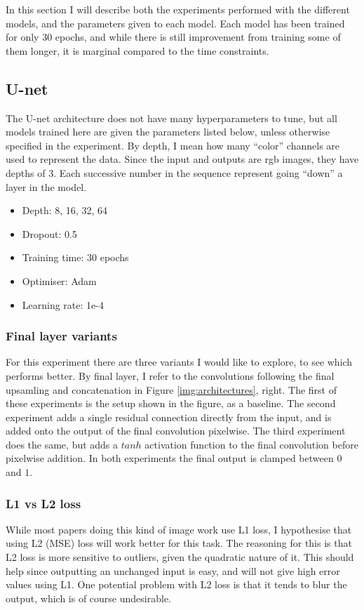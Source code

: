 In this section I will describe both the experiments performed with the different models, and the parameters given to each model. Each model has been trained for only 30 epochs, and while there is still improvement from training some of them longer, it is marginal compared to the time constraints.
\subsection{U-net}
The U-net architecture does not have many hyperparameters to tune, but all models trained here are given the parameters listed below, unless otherwise specified in the experiment. By depth, I mean how many ``color'' channels are used to represent the data. Since the input and outputs are rgb images, they have depths of 3. Each successive number in the sequence represent going ``down'' a layer in the model.
\begin{itemize}
\item Depth: 8, 16, 32, 64
\item Dropout: 0.5
\item Training time: 30 epochs
\item Optimiser: Adam
\item Learning rate: 1e-4
\end{itemize}

\subsubsection{Final layer variants}
For this experiment there are three variants I would like to explore, to see which performs better. By final layer, I refer to the convolutions following the final upsamling and concatenation in Figure \ref{img:architectures}, right. The first of these experiments is the setup shown in the figure, as a baseline. The second experiment adds a single residual connection directly from the input, and is added onto the output of the final convolution pixelwise. The third experiment does the same, but adds a $tanh$ activation function to the final convolution before pixelwise addition. In both experiments the final output is clamped between $0$ and $1$.

\subsubsection{L1 vs L2 loss}
While most papers doing this kind of image work use L1 loss, I hypothesise that using L2 (MSE) loss will work better for this task. The reasoning for this is that L2 loss is more sensitive to outliers, given the quadratic nature of it. This should help since outputting an unchanged input is easy, and will not give high error values using L1. One potential problem with L2 loss is that it tends to blur the output, which is of course undesirable.

